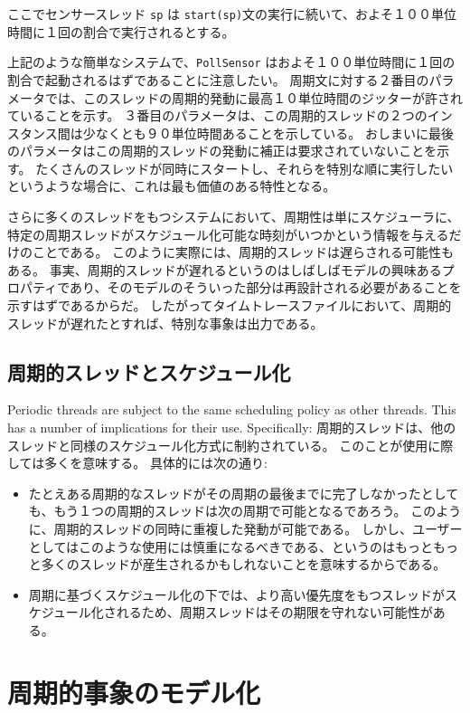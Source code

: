 \documentclass[\pformat,12pt]{jreport}
\begin{document}
ここでセンサースレッド \texttt{sp} は \texttt{start(sp)}文の実行に続いて、およそ１００単位時間に１回の割合で実行されるとする。

上記のような簡単なシステムで、\texttt{PollSensor} はおよそ１００単位時間に１回の割合で起動されるはずであることに注意したい。
周期文に対する２番目のパラメータでは、このスレッドの周期的発動に最高１０単位時間のジッターが許されていることを示す。
３番目のパラメータは、この周期的スレッドの２つのインスタンス間は少なくとも９０単位時間あることを示している。
おしまいに最後のパラメータはこの周期的スレッドの発動に補正は要求されていないことを示す。
たくさんのスレッドが同時にスタートし、それらを特別な順に実行したいというような場合に、これは最も価値のある特性となる。

さらに多くのスレッドをもつシステムにおいて、周期性は単にスケジューラに、特定の周期スレッドがスケジュール化可能な時刻がいつかという情報を与えるだけのことである。
このように実際には、周期的スレッドは遅らされる可能性もある。
事実、周期的スレッドが遅れるというのはしばしばモデルの興味あるプロパティであり、そのモデルのそういった部分は再設計される必要があることを示すはずであるからだ。
したがってタイムトレースファイルにおいて、周期的スレッドが遅れたとすれば、特別な事象は出力である。

\subsection{周期的スレッドとスケジュール化}

Periodic threads are subject to the same scheduling policy as other
threads. This has a number of implications for their
use. Specifically:
周期的スレッドは、他のスレッドと同様のスケジュール化方式に制約されている。
このことが使用に際しては多くを意味する。
具体的には次の通り:

\begin{itemize}
\item たとえある周期的なスレッドがその周期の最後までに完了しなかったとしても、もう１つの周期的スレッドは次の周期で可能となるであろう。
このように、周期的スレッドの同時に重複した発動が可能である。
しかし、ユーザーとしてはこのような使用には慎重になるべきである、というのはもっともっと多くのスレッドが産生されるかもしれないことを意味するからである。
\item 周期に基づくスケジュール化の下では、より高い優先度をもつスレッドがスケジュール化されるため、周期スレッドはその期限を守れない可能性がある。
\end{itemize}

\section{周期的事象のモデル化}\label{sec:modperevents}
\end{document}

